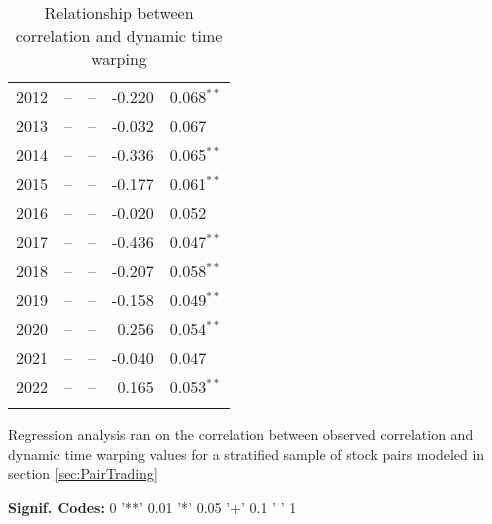 \documentclass[12pt]{article}
\begin{document}
\begin{table}
\begin{tabular}{l r l r l}
        2012            &      -- &              -- &  -0.220 & 0.068{$^{**}$}  \\
        2013            &      -- &              -- &  -0.032 & 0.067           \\
        2014            &      -- &              -- &  -0.336 & 0.065{$^{**}$}  \\
        2015            &      -- &              -- &  -0.177 & 0.061{$^{**}$}  \\
        2016            &      -- &              -- &  -0.020 & 0.052           \\
        2017            &      -- &              -- &  -0.436 & 0.047{$^{**}$}  \\
        2018            &      -- &              -- &  -0.207 & 0.058{$^{**}$}  \\
        2019            &      -- &              -- &  -0.158 & 0.049{$^{**}$}  \\
        2020            &      -- &              -- &   0.256 & 0.054{$^{**}$}  \\
        2021            &      -- &              -- &  -0.040 & 0.047           \\
        2022            &      -- &              -- &   0.165 & 0.053{$^{**}$}  \\
        \vspace{-1mm} \\
        \hline
    \end{tabular}
    \caption{Relationship between correlation and dynamic time warping}
    \begin{tablenotes}
        \item{Regression analysis ran on the correlation between observed correlation and dynamic time warping values for a stratified sample of stock pairs modeled in section \ref{sec:PairTrading}}
        \item{\footnotesize \textbf{Signif. Codes:} 0 '**' 0.01 '*' 0.05 '+' 0.1 ' ' 1}
    \end{tablenotes}
    \label{tbl:correlation_to_log_dtw_regression}
\end{table}


\pagebreak
\end{document}
